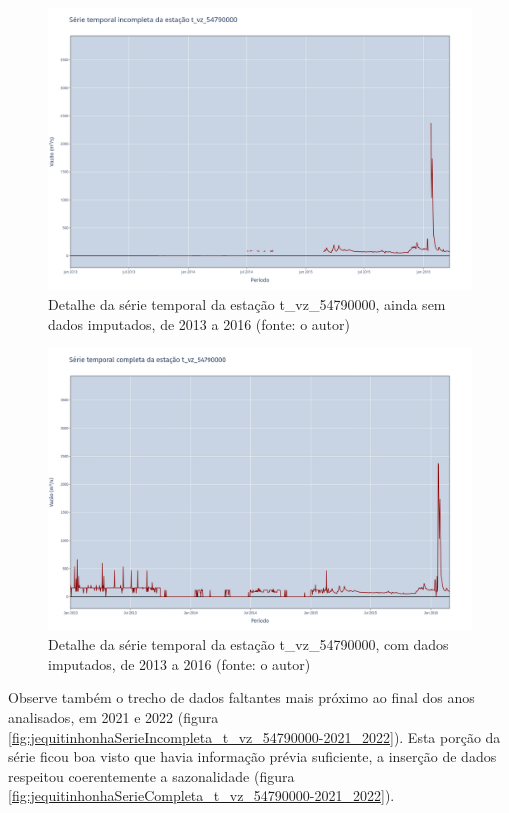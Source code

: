 \begin{figure}[!h]
\centering
\includegraphics[scale=0.25]{Figuras/jequiti/jequitinhonhaSerieIncompleta_t_vz_54790000-2013_2016.png}
\caption{Detalhe da série temporal da estação t\_vz\_54790000, ainda sem dados imputados, de 2013 a 2016 (fonte: o autor)}
\label{fig:jequitinhonhaSerieIncompleta_t_vz_54790000-2013_2016}
\end{figure}

\begin{figure}[!h]
\centering
\includegraphics[scale=0.25]{Figuras/jequiti/jequitinhonhaSerieCompleta_t_vz_54790000-2013_2016.png}
\caption{Detalhe da série temporal da estação t\_vz\_54790000, com dados imputados, de 2013 a 2016 (fonte: o autor)}
\label{fig:jequitinhonhaSerieCompleta_t_vz_54790000-2013_2016}
\end{figure}

Observe também o trecho de dados faltantes mais próximo ao final dos anos analisados, em 2021 e 2022 (figura \ref{fig:jequitinhonhaSerieIncompleta_t_vz_54790000-2021_2022}). Esta porção da série ficou boa visto que havia informação prévia suficiente, a inserção de dados respeitou coerentemente a sazonalidade (figura \ref{fig:jequitinhonhaSerieCompleta_t_vz_54790000-2021_2022}).

